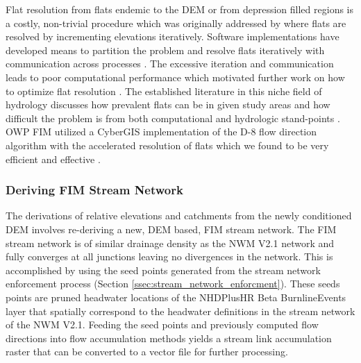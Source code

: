 \documentclass[draft]{dependencies/agujournal2019}
\begin{document}
Flat resolution from flats endemic to the DEM or from depression filled regions is a costly, non-trivial procedure which was originally addressed by  where flats are resolved by incrementing elevations iteratively.
Software implementations have developed means to partition the problem and resolve flats iteratively with communication across processes \cite{tarboton2009generalized,tesfa2011extraction,wallis2009parallel,tarboton2005terrain}.
The excessive iteration and communication leads to poor computational performance which motivated further work on how to optimize flat resolution \cite{survila2016scalable,barnes2014efficient}.
The established literature in this niche field of hydrology discusses how prevalent flats can be in given study areas and how difficult the problem is from both computational and hydrologic stand-points \cite{garbrecht1997assignment,tarboton2009generalized,tarboton2005terrain,survila2016scalable,barnes2014efficient,tesfa2011extraction,wallis2009parallel}.
OWP FIM utilized a CyberGIS implementation of the D-8 flow direction algorithm with the accelerated resolution of flats which we found to be very efficient and effective \cite{survila2016scalable,cybergis2016}.
%
\subsubsection{Deriving FIM Stream Network}
\label{sssec:deriving_fim_stream_network}
%
The derivations of relative elevations and catchments from the newly conditioned DEM involves re-deriving a new, DEM based, FIM stream network. 
The FIM stream network is of similar drainage density as the NWM V2.1 network and fully converges at all junctions leaving no divergences in the network.
This is accomplished by using the seed points generated from the stream network enforcement process (Section \ref{ssec:stream_network_enforcment}).
These seeds points are pruned headwater locations of the NHDPlusHR Beta BurnlineEvents layer that spatially correspond to the headwater definitions in the stream network of the NWM V2.1.
Feeding the seed points and previously computed flow directions into flow accumulation methods \cite{wallis2009parallel,tarboton1997new,tarboton2005terrain} yields a stream link accumulation raster that can be converted to a vector file for further processing.
\end{document}
